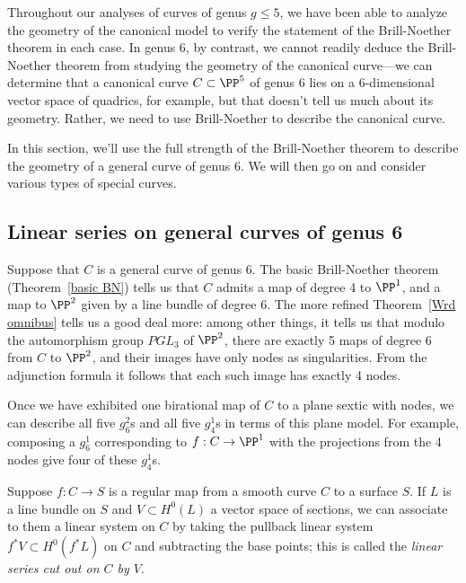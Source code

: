 Throughout our analyses of curves of genus $g \leq 5$, we have been able to analyze the geometry of the canonical model to verify the statement of the Brill-Noether theorem in each case. In genus 6, by contrast, we cannot readily deduce the Brill-Noether theorem from studying the geometry of the canonical curve---we can determine that a canonical curve $C \subset \PP^5$ of genus 6 lies on a 6-dimensional vector space of quadrics, for example, but that doesn't tell us much about its geometry. Rather, we need to use Brill-Noether to describe the canonical curve. 

In this section, we'll use the full strength of the Brill-Noether theorem to describe the geometry of a general curve of genus 6. We will then go on and consider various types of special curves.

\subsection{Linear series on general curves of genus 6}\label{general genus 6}

Suppose that $C$ is a general curve of genus 6. The basic Brill-Noether theorem (Theorem~\ref{basic BN}) tells us that $C$ admits a map of degree 4 to $\PP^1$, and a map to $\PP^2$ given by a line bundle of degree 6. The more refined Theorem~\ref{Wrd omnibus} tells us a good deal more: among other things, it tells us that modulo the automorphism group $PGL_3$ of $\PP^2$, there are exactly 5 maps of degree 6 from $C$ to $\PP^2$, and their images have only nodes
as singularities. From the adjunction formula it follows that each such image has exactly 4 nodes.
 
 
Once we have exhibited one birational map of $C$ to a plane sextic with nodes, we can describe all five $g^2_6$s and all five $g^1_4$s in terms of this plane model. For example, composing a $g^1_6$ corresponding to $f: C\to \PP^1$ with the projections from the 4 nodes give four of these $g^1_4$s. 


Suppose $f : C \to S$ is a regular map from a smooth curve $C$ to a surface $S$. If $L$ is a line bundle on $S$ and $V \subset H^0(L)$ a vector space of sections, we can associate to them a linear system on $C$ by taking the pullback linear system $f^*V \subset H^0(f^*L)$ on $C$ and subtracting the base points; this is called the \emph{linear series cut out on $C$ by $V$}. 

